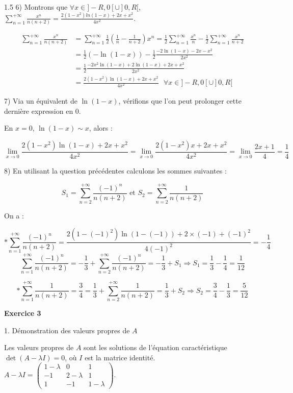 \documentclass[12pt]{article}
\begin{document}
\begin{spacing}{1.5}
6) Montrons que $\forall x\in ]-R,0[\cup ]0,R[$, $\sum_{n=1}^{+\infty}\frac{x^n}{n(n+2)}=\frac{2(1-x^2)ln(1-x)+2x+x^2}{4x^2}$.


\begin{align*}
\sum_{n=1}^{+\infty}\frac{x^n}{n(n+2)} &=\sum_{n=1}^{+\infty}\frac{1}{2}\left(\frac{1}{n}-\frac{1}{n+2}\right)x^n =\frac{1}{2}\sum_{n=1}^{+\infty}\frac{x^n}{n} - \frac{1}{2}\sum_{n=1}^{+\infty}\frac{x^n}{n+2}\\
&=\frac{1}{2}(-\ln(1-x))-\frac{1}{2}\frac{-2\ln(1-x)-2x-x^2}{2x^2}\\
&=\frac{1}{2}\frac{-2x^2\ln(1-x)+2\ln(1-x)+2x+x^2}{2x^2}\\
 &=\frac{2(1-x^2)\ln(1-x)+2x+x^2}{4x^2}\text{  } \forall x\in ]-R,0[\cup ]0,R[
\end{align*}


7) Via un équivalent de $\ln(1-x)$, vérifions que l'on peut prolonger cette dernière expression en 0.


En $x=0$, $\ln(1-x)\sim x$, alors :

\[\lim_{x\to 0}\frac{2(1-x^2)\ln(1-x)+2x+x^2}{4x^2}=\lim_{x\to 0}\frac{2(1-x^2)x+2x+x^2}{4x^2}=\lim_{x\to 0}\frac{2x+1}{4}=\frac{1}{4}\]

8) En utilisant la question précédentes calculons les sommes suivantes :

\[S_1=\sum_{n=2}^{+\infty}\frac{(-1)^n}{n(n+2)} \text{ et } S_2=\sum_{n=2}^{+\infty}\frac{1}{n(n+2)}\]

On a :

\[* \sum_{n=1}^{+\infty}\frac{(-1)^n}{n(n+2)}=\frac{2(1-(-1)^2)\ln(1-(-1))+2\times(-1)+(-1)^2}{4(-1)^2}=-\frac{1}{4}\]
\[\sum_{n=1}^{+\infty}\frac{(-1)^n}{n(n+2)}=-\frac{1}{3}+\sum_{n=2}^{+\infty}\frac{(-1)^n}{n(n+2)}=-\frac{1}{3}+S_1\Rightarrow S_1=\frac{1}{3}-\frac{1}{4}=\frac{1}{12}\]


\[* \sum_{n=1}^{+\infty}\frac{1}{n(n+2)}=\frac{3}{4}=\frac{1}{3}+\sum_{n=2}^{+\infty}\frac{1}{n(n+2)}=\frac{1}{3}+S_2\Rightarrow S_2 =\frac{3}{4}-\frac{1}{3}=\frac{5}{12}\]







\medskip\textbf{Exercice 3}

1. Démonstration des valeurs propres de $A$

Les valeurs propres de $A$ sont les solutions de l'équation caractéristique $\det(A - \lambda I) = 0$, où $I$ est la matrice identité. $
A - \lambda I = 
\begin{pmatrix}
1-\lambda & 0 & 1 \\ 
-1 & 2-\lambda & 1 \\ 
1 & -1 & 1-\lambda
\end{pmatrix}.
$


\end{spacing}
\end{document}
